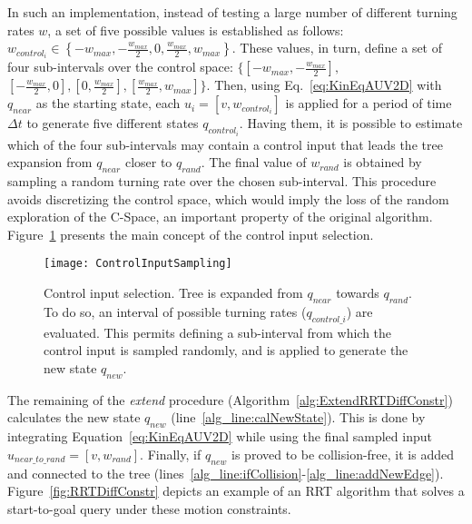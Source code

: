 In such an implementation, instead of testing a large number of different
turning rates $w$, a set of five possible values is established as
follows: $w_{control_i} \in \left\{-w_{max}, -\frac{w_{max}}{2}, 0,
\frac{w_{max}}{2}, w_{max}\right\}$. These values, in turn, define a
set of four sub-intervals over the control space:
%
$\{[-w_{max}, -\frac{w_{max}}{2}],$ $[-\frac{w_{max}}{2}, 0],
[0, \frac{w_{max}}{2}], [\frac{w_{max}}{2}, w_{max}]\}$.
%
Then, using Eq.~\eqref{eq:KinEqAUV2D} with $q_{near}$ as the starting state, each
$u_i = \left[v, w_{control_i}\right]$ is applied for a period of time $\Delta t$
to generate five different states $q_{control_i}$. Having them, it is possible
to estimate which of the four sub-intervals may contain a control input that
leads the tree expansion from $q_{near}$ closer to $q_{rand}$. The final value
of $w_{rand}$ is obtained by sampling a random turning rate over the chosen
sub-interval. This procedure avoids discretizing the control space, which would
imply the loss of the random exploration of the \ac{C-Space}, an important
property of the original algorithm. Figure~\ref{fig:ControlInputSampling}
presents the main concept of the control input selection.

\begin{figure}[htbp]
	\centering
	\texttt{[image: ControlInputSampling]} \quad
	\caption[Control input selection for expanding an RRT under the differential
	equation.]
	{Control input selection. Tree is expanded from $q_{near}$ towards
	$q_{rand}$. To do so, an interval of possible turning rates ($q_{control\_i}$)
	are evaluated. This permits defining a sub-interval from which the control
	input is sampled randomly, and is applied to generate the new state
	$q_{new}$.}
	\label{fig:ControlInputSampling}
\end{figure}

The remaining of the \textit{extend} procedure
(Algorithm~\ref{alg:ExtendRRTDiffConstr}) calculates the new state $q_{new}$
(line~\ref{alg_line:calNewState}). This is done by integrating
Equation~\eqref{eq:KinEqAUV2D} while using the final sampled input $u_{near\_
to\_rand} = \left[v, w_{rand}\right]$. Finally, if $q_{new}$ is proved to be
collision-free, it is added and connected to the tree
(lines~\ref{alg_line:ifCollision}-\ref{alg_line:addNewEdge}).
Figure~\ref{fig:RRTDiffConstr} depicts an example of an \ac{RRT} algorithm that
solves a start-to-goal query under these motion constraints.

